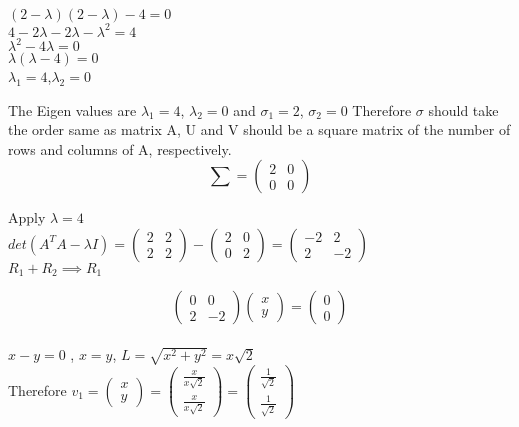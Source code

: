\documentclass[12pt, oneside]{article}   	%
\begin{document}
\begin{enumerate}
	$(2-\lambda)(2-\lambda)-4=0$\\
	$4-2\lambda-2\lambda-\lambda^2=4$\\
	$\lambda^2 -4\lambda=0$\\
	$\lambda(\lambda -4)=0$\\
	$ \lambda_1=4$,$\lambda_2=0$
	
	
	The Eigen values are $\lambda_1=4$, $\lambda_2=0$ and  $\sigma_1=2$, $\sigma_2=0$ Therefore $\sigma$ should take the order same as matrix A, U and V should be a square matrix of the number of rows and columns of A, respectively. 
	$$
	\sum =\left( \begin{array}{cc} 2 & 0 \\ 0 & 0 \end{array} \right) 
	$$
	
	Apply $\lambda= 4$\\
	$det(A^TA- \lambda I)= \left( \begin{array}{cc} 2 & 2 \\ 2 & 2  \end{array} \right)- \left( \begin{array}{cc} 2 & 0 \\ 0 & 2  \end{array} \right) =\left( \begin{array}{cc} -2 & 2 \\ 2 & -2 \end{array} \right)$\\
	
	$R_1 + R_2 \implies R_1$
	
	
	$$\left( \begin{array}{cc} 0 & 0 \\ 2 & -2  \end{array} \right) \left( \begin{array}{c} x \\ y \end{array} \right) =\left( \begin{array}{c} 0 \\ 0  \end{array} \right)$$ \\
	
	$x-y=0$ , $x=y$, $L=\sqrt{x^2+y^2}= x\sqrt{2}$\\ 
	Therefore $v_1= \left( \begin{array}{c} x \\ y  \end{array} \right)=\left( \begin{array}{c} \frac{x}{x\sqrt{2}} \\ \frac{x}{x\sqrt{2}} \end{array} \right) = \left( \begin{array}{c} \frac{1}{\sqrt{2}} \\ \frac{1}{\sqrt{2}} \end{array} \right)$\\
	

\end{enumerate}
\end{document}
